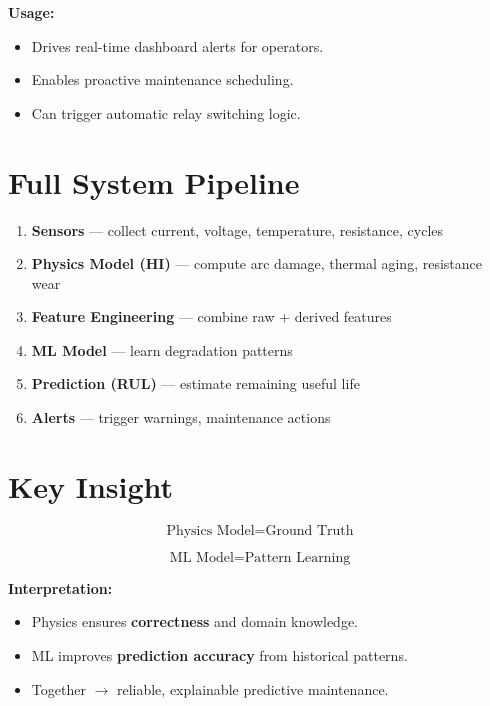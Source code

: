 \documentclass[12pt]{article}
\begin{document}
\textbf{Usage:}
\begin{itemize}
  \item Drives real-time dashboard alerts for operators.
  \item Enables proactive maintenance scheduling.
  \item Can trigger automatic relay switching logic.
\end{itemize}


\section{Full System Pipeline}

\begin{enumerate}
  \item \textbf{Sensors} --- collect current, voltage, temperature, resistance, cycles
  \item \textbf{Physics Model (HI)} --- compute arc damage, thermal aging, resistance wear
  \item \textbf{Feature Engineering} --- combine raw + derived features
  \item \textbf{ML Model} --- learn degradation patterns
  \item \textbf{Prediction (RUL)} --- estimate remaining useful life
  \item \textbf{Alerts} --- trigger warnings, maintenance actions
\end{enumerate}


\section{Key Insight}

\[
\text{Physics Model} = \text{Ground Truth}
\]

\[
\text{ML Model} = \text{Pattern Learning}
\]

\textbf{Interpretation:}
\begin{itemize}
  \item Physics ensures \textbf{correctness} and domain knowledge.
  \item ML improves \textbf{prediction accuracy} from historical patterns.
  \item Together $\rightarrow$ reliable, explainable predictive maintenance.
\end{itemize}
\end{document}
